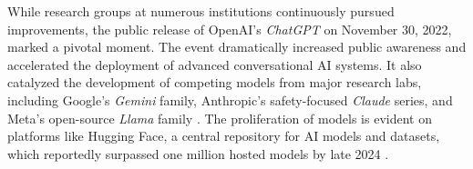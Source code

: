 While research groups at numerous institutions continuously pursued improvements, the public release of OpenAI's \textit{ChatGPT} on November 30, 2022, marked a pivotal moment. The event dramatically increased public awareness and accelerated the deployment of advanced conversational AI systems. It also catalyzed the development of competing models from major research labs, including Google's \textit{Gemini} family, Anthropic's safety-focused \textit{Claude} series, and Meta's open-source \textit{Llama} family \parencite{RefWorks:RefID:93-team2024gemini,RefWorks:RefID:94-caruccio2024claude,RefWorks:RefID:95-grattafiori2024llama}. The proliferation of models is evident on platforms like Hugging Face, a central repository for AI models and datasets, which reportedly surpassed one million hosted models by late 2024 \parencite{RefWorks:RefID:84-edwards2024exponential}.

